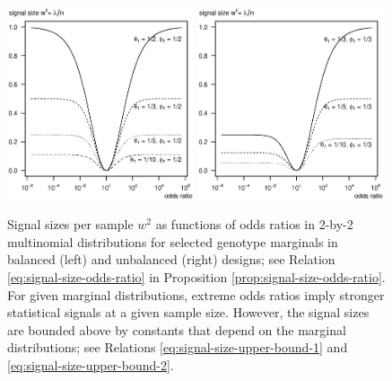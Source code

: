 \begin{figure}
      \centering
      \includegraphics[width=0.49\textwidth]{figures/chisq_signal_size/singal-vs-odds-p05}
      \includegraphics[width=0.49\textwidth]{figures/chisq_signal_size/singal-vs-odds-p0333}            
      \caption{Signal sizes per sample $w^2$ as functions of odds ratios in 2-by-2 multinomial distributions for selected genotype marginals in balanced (left) and unbalanced (right) designs; see Relation \eqref{eq:signal-size-odds-ratio} in Proposition \ref{prop:signal-size-odds-ratio}. For given marginal distributions, extreme odds ratios imply stronger statistical signals at a given sample size. However, the signal sizes are bounded above by constants that depend on the marginal distributions; see Relations \eqref{eq:signal-size-upper-bound-1} and \eqref{eq:signal-size-upper-bound-2}. %
      } 
      \label{fig:signal-vs-odds}
\end{figure}

